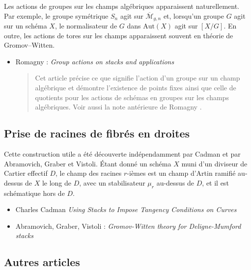 \noindent
Les actions de groupes sur les champs algébriques apparaissent naturellement.
Par exemple, le groupe symétrique $S_n$ agit sur
$\overline{\mathcal{M}}_{g, n}$ et, lorsqu'un groupe $G$ agit sur un schéma
$X$, le normalisateur de $G$ dans $\text{Aut}(X)$ agit sur $[X/G]$. En outre,
les actions de tores sur les champs apparaissent souvent en théorie de
Gromov--Witten.
\begin{itemize}
\item Romagny : \emph{Group actions on stacks and applications}
\cite{romagny_actions}
\begin{quote}
Cet article précise ce que signifie l'action d'un groupe sur un champ
algébrique et démontre l'existence de points fixes ainsi que celle de
quotients pour les actions de schémas en groupes sur les champs algébriques.
Voir aussi la note antérieure de Romagny \cite{romagny_notes}.
\end{quote}
\end{itemize}

\subsection{Prise de racines de fibrés en droites}
\label{subsection-root-stacks}

\noindent
Cette construction utile a été découverte indépendamment par Cadman et par
Abramovich, Graber et Vistoli. Étant donné un schéma $X$ muni d'un diviseur de
Cartier effectif $D$, le champ des racines $r$-ièmes est un champ d'Artin
ramifié au-dessus de $X$ le long de $D$, avec un stabilisateur $\mu_r$ au-dessus
de $D$, et il est schématique hors de $D$.
\begin{itemize}
\item Charles Cadman
\emph{Using Stacks to Impose Tangency Conditions on Curves}
\cite{cadman}
\item Abramovich, Graber, Vistoli : \emph{Gromov-Witten theory for
Deligne-Mumford stacks} \cite{agv}
\end{itemize}

\subsection{Autres articles}
\label{subsection-other}


